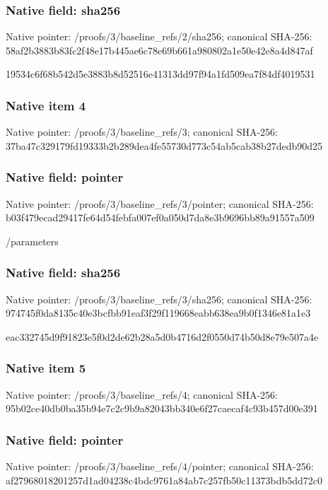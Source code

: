 \documentclass[10pt,a4paper]{article}
\begin{document}
\subsubsection{Native field: sha256}
Native pointer: /proofs/3/baseline\_\allowbreak{}refs/2/sha256; canonical SHA-256: 58af2b3883b83fc2f48e17b445ae6c78e69b661a980802a1e50e42e8a4d847af

\begingroup\raggedright\sloppy 19534c6f68b542d5e3883b8d52516e41313dd97f94a1fd509ea7f84df4019531\par\endgroup

\subsubsection{Native item 4}
Native pointer: /proofs/3/baseline\_\allowbreak{}refs/3; canonical SHA-256: 37ba47c329179fd19333b2b289dea4fe55730d773c54ab5cab38b27dedb90d25

\subsubsection{Native field: pointer}
Native pointer: /proofs/3/baseline\_\allowbreak{}refs/3/pointer; canonical SHA-256: b03f479ecad29417fe64d54febfa007ef0a050d7da8e3b9696bb89a91557a509

\begingroup\raggedright\sloppy /\allowbreak{}parameters\par\endgroup

\subsubsection{Native field: sha256}
Native pointer: /proofs/3/baseline\_\allowbreak{}refs/3/sha256; canonical SHA-256: 974745f0da8135c40e3bcfbb91eaf3f29f119668eabb638ea9b0f1346e81a1e3

\begingroup\raggedright\sloppy eac332745d9f91823e5f0d2de62b28a5d0b4716d2f0550d74b50d8e79e507a4e\par\endgroup

\subsubsection{Native item 5}
Native pointer: /proofs/3/baseline\_\allowbreak{}refs/4; canonical SHA-256: 95b02ce40db0ba35b94e7c2c9b9a82043bb340e6f27caecaf4c93b457d00e391

\subsubsection{Native field: pointer}
Native pointer: /proofs/3/baseline\_\allowbreak{}refs/4/pointer; canonical SHA-256: af27968018201257d1ad04238c4bdc9761a84ab7c257fb50c11373bdb5dd72c0
\end{document}
